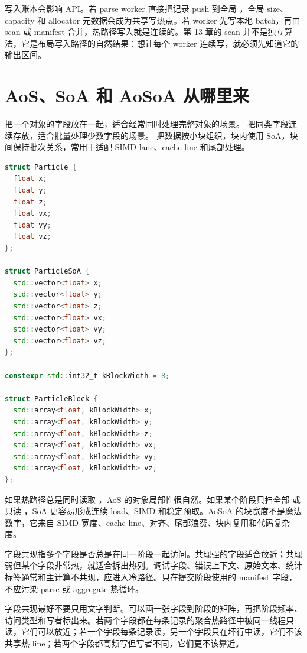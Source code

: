 写入账本会影响 API。若 parse worker 直接把记录 push 到全局 ，全局 size、capacity 和 allocator 元数据会成为共享写热点。若 worker 先写本地 batch，再由 scan 或 manifest 合并，热路径写入就是连续的。第 13 章的 scan 并不是独立算法，它是布局写入路径的自然结果：想让每个 worker 连续写，就必须先知道它的输出区间。

\section{AoS、SoA 和 AoSoA 从哪里来}

 把一个对象的字段放在一起，适合经常同时处理完整对象的场景。 把同类字段连续存放，适合批量处理少数字段的场景。 把数据按小块组织，块内使用 SoA，块间保持批次关系，常用于适配 SIMD lane、cache line 和尾部处理。

\begin{lstlisting}[language=C++,caption={AoS、SoA 与 AoSoA 的基本形态}]
struct Particle {
  float x;
  float y;
  float z;
  float vx;
  float vy;
  float vz;
};

struct ParticleSoA {
  std::vector<float> x;
  std::vector<float> y;
  std::vector<float> z;
  std::vector<float> vx;
  std::vector<float> vy;
  std::vector<float> vz;
};

constexpr std::int32_t kBlockWidth = 8;

struct ParticleBlock {
  std::array<float, kBlockWidth> x;
  std::array<float, kBlockWidth> y;
  std::array<float, kBlockWidth> z;
  std::array<float, kBlockWidth> vx;
  std::array<float, kBlockWidth> vy;
  std::array<float, kBlockWidth> vz;
};
\end{lstlisting}

如果热路径总是同时读取 ，AoS 的对象局部性很自然。如果某个阶段只扫全部  或只读 ，SoA 更容易形成连续 load、SIMD 和稳定预取。AoSoA 的块宽度不是魔法数字，它来自 SIMD 宽度、cache line、对齐、尾部浪费、块内复用和代码复杂度。

字段共现指多个字段是否总是在同一阶段一起访问。共现强的字段适合放近；共现弱但某个字段非常热，就适合拆出热列。调试字段、错误上下文、原始文本、统计标签通常和主计算不共现，应进入冷路径。只在提交阶段使用的 manifest 字段，不应污染 parse 或 aggregate 热循环。

字段共现最好不要只用文字判断。可以画一张字段到阶段的矩阵，再把阶段频率、访问类型和写者标出来。若两个字段都在每条记录的聚合热路径中被同一线程只读，它们可以放近；若一个字段每条记录读，另一个字段只在坏行中读，它们不该共享热 line；若两个字段都高频写但写者不同，它们更不该靠近。

